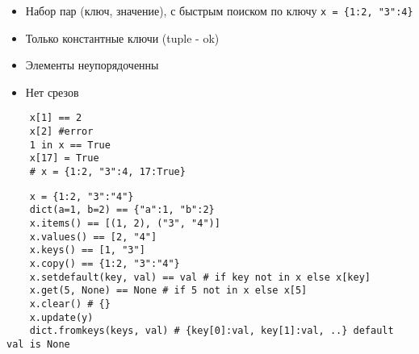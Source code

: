 \documentclass{article}
\begin{document}
\begin{itemize}
    \item Набор пар (ключ, значение), с быстрым поиском по ключу
    \lstinline$x = {1:2, "3":4}$
    \item Только константные ключи (tuple - ok)
    \item Элементы неупорядоченны
    \item Нет срезов
\end{itemize}
\vspace{15pt}
\begin{lstlisting}
    x[1] == 2
    x[2] #error
    1 in x == True
    x[17] = True
    # x = {1:2, "3":4, 17:True}
\end{lstlisting}
\newpage

\vspace{15pt}
\begin{lstlisting}
    x = {1:2, "3":"4"}
    dict(a=1, b=2) == {"a":1, "b":2}
    x.items() == [(1, 2), ("3", "4")]
    x.values() == [2, "4"]
    x.keys() == [1, "3"]
    x.copy() == {1:2, "3":"4"}
    x.setdefault(key, val) == val # if key not in x else x[key]
    x.get(5, None) == None # if 5 not in x else x[5]
    x.clear() # {}
    x.update(y)
    dict.fromkeys(keys, val) # {key[0]:val, key[1]:val, ..} default val is None
\end{lstlisting}
\newpage

\end{document}
